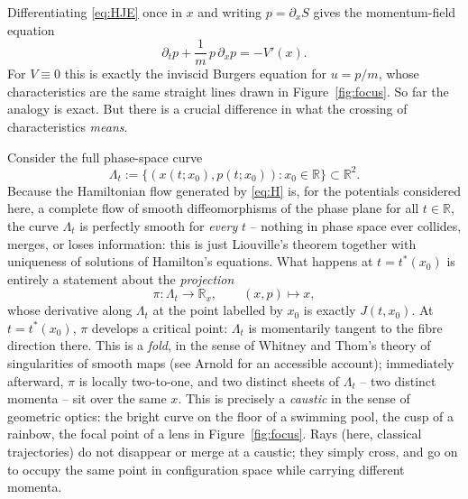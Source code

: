 \documentclass[11pt]{article}
\theoremstyle{plain}
\theoremstyle{definition}
\theoremstyle{remark}
\begin{document}
Differentiating \eqref{eq:HJE} once in $x$ and writing $p=\partial_xS$ gives the momentum-field equation
\begin{equation}
\partial_tp + \frac{1}{m}\,p\,\partial_xp = -V'(x).
\label{eq:burgers}
\end{equation}
For $V\equiv0$ this is exactly the inviscid Burgers equation for $u=p/m$, whose
characteristics are the same straight lines drawn in Figure~\ref{fig:focus}. So
far the analogy is exact. But there is a crucial difference in what the
crossing of characteristics \emph{means}.

Consider the full phase-space curve
\[
\Lambda_t := \big\{(x(t;x_0),p(t;x_0)) : x_0\in\mathbb{R}\big\} \subset \mathbb{R}^2.
\]
Because the Hamiltonian flow generated by \eqref{eq:H} is, for the potentials
considered here, a complete flow of smooth diffeomorphisms of the phase plane
for all $t\in\mathbb{R}$, the curve $\Lambda_t$ is perfectly smooth for
\emph{every} $t$ -- nothing in phase space ever collides, merges, or loses
information: this is just Liouville's theorem together with uniqueness of
solutions of Hamilton's equations. What happens at $t=t^\ast(x_0)$ is entirely
a statement about the \emph{projection}
\[
\pi:\Lambda_t\to\mathbb{R}_x, \qquad (x,p)\mapsto x,
\]
whose derivative along $\Lambda_t$ at the point labelled by $x_0$ is exactly
$J(t,x_0)$. At $t=t^\ast(x_0)$, $\pi$ develops a critical point: $\Lambda_t$ is
momentarily tangent to the fibre direction there. This is a \emph{fold}, in the
sense of Whitney and Thom's theory of singularities of smooth maps (see Arnold
\cite{ArnoldCatastrophe} for an accessible account); immediately afterward,
$\pi$ is locally two-to-one, and two distinct sheets of $\Lambda_t$ -- two
distinct momenta -- sit over the same $x$. This is precisely a \emph{caustic}
in the sense of geometric optics: the bright curve on the floor of a swimming
pool, the cusp of a rainbow, the focal point of a lens in
Figure~\ref{fig:focus}. Rays (here, classical trajectories) do not disappear or
merge at a caustic; they simply cross, and go on to occupy the same point in
configuration space while carrying different momenta.
\end{document}
